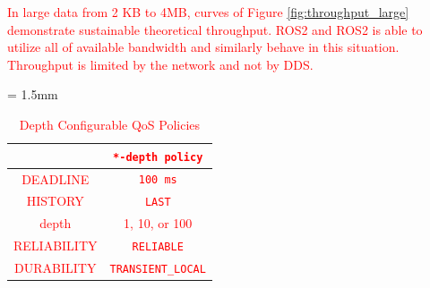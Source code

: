 \documentclass{sig-alternate-05-2015}
\begin{document}
\textcolor{red}{
In large data from 2 KB to 4MB, curves of Figure \ref{fig:throughput_large} demonstrate sustainable theoretical throughput.
ROS2 and ROS2 is able to utilize all of available bandwidth and similarly behave in this situation.
Throughput is limited by the network and not by DDS.
}

\renewcommand{\arraystretch}{1.0}
\begin{table}[t]
  \caption{\label{tb:depth_qos}\textcolor{red}{Depth Configurable QoS Policies}}
  \centering
  \tabcolsep = 1.5mm              %
  \textcolor{red}{
  \begin{tabular}{c|c}
    \hline
    & \textbf{\texttt{*-depth policy} }\\
    \hline
    \hline
    DEADLINE & \texttt{100 ms}\\
    HISTORY & \texttt{LAST}\\
    depth & 1, 10, or 100\\
    RELIABILITY & \texttt{RELIABLE}\\
    DURABILITY & \texttt{TRANSIENT\_LOCAL}\\
    \hline
  \end{tabular}
  }
  \vspace{-5mm}
\end{table}
\end{document}
